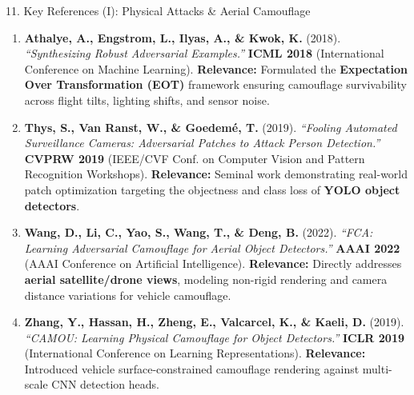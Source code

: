 \documentclass[aspectratio=169, 10pt]{beamer}
\begin{document}
\begin{frame}{11. Key References (I): Physical Attacks \& Aerial Camouflage}
\scriptsize

\begin{enumerate}
    \setlength{\itemsep}{6pt}
    
    \item \textbf{Athalye, A., Engstrom, L., Ilyas, A., \& Kwok, K.} (2018).  
    \textit{``Synthesizing Robust Adversarial Examples.''}  
    \textbf{ICML 2018} (International Conference on Machine Learning).  
    \textcolor{NavyBlue}{\textbf{Relevance:}} Formulated the \textbf{Expectation Over Transformation (EOT)} framework ensuring camouflage survivability across flight tilts, lighting shifts, and sensor noise.

    \item \textbf{Thys, S., Van Ranst, W., \& Goedem{\'e}, T.} (2019).  
    \textit{``Fooling Automated Surveillance Cameras: Adversarial Patches to Attack Person Detection.''}  
    \textbf{CVPRW 2019} (IEEE/CVF Conf. on Computer Vision and Pattern Recognition Workshops).  
    \textcolor{NavyBlue}{\textbf{Relevance:}} Seminal work demonstrating real-world patch optimization targeting the objectness and class loss of \textbf{YOLO object detectors}.

    \item \textbf{Wang, D., Li, C., Yao, S., Wang, T., \& Deng, B.} (2022).  
    \textit{``FCA: Learning Adversarial Camouflage for Aerial Object Detectors.''}  
    \textbf{AAAI 2022} (AAAI Conference on Artificial Intelligence).  
    \textcolor{NavyBlue}{\textbf{Relevance:}} Directly addresses \textbf{aerial satellite/drone views}, modeling non-rigid rendering and camera distance variations for vehicle camouflage.

    \item \textbf{Zhang, Y., Hassan, H., Zheng, E., Valcarcel, K., \& Kaeli, D.} (2019).  
    \textit{``CAMOU: Learning Physical Camouflage for Object Detectors.''}  
    \textbf{ICLR 2019} (International Conference on Learning Representations).  
    \textcolor{NavyBlue}{\textbf{Relevance:}} Introduced vehicle surface-constrained camouflage rendering against multi-scale CNN detection heads.

\end{enumerate}
\end{frame}
\end{document}
